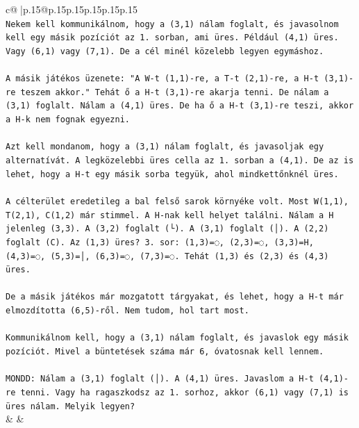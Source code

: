\documentclass{article}
\begin{document}
{\begin{supertabular}{c@{$\;$}|p{.15\linewidth}@{}p{.15\linewidth}p{.15\linewidth}p{.15\linewidth}p{.15\linewidth}p{.15\linewidth}}
{{{\\ 
\texttt{Nekem kell kommunikálnom, hogy a (3,1) nálam foglalt, és javasolnom kell egy másik pozíciót az 1. sorban, ami üres. Például (4,1) üres. Vagy (6,1) vagy (7,1). De a cél minél közelebb legyen egymáshoz. } \\
\\ 
\texttt{A másik játékos üzenete: "A W{-}t (1,1){-}re, a T{-}t (2,1){-}re, a H{-}t (3,1){-}re teszem akkor." Tehát ő a H{-}t (3,1){-}re akarja tenni. De nálam a (3,1) foglalt. Nálam a (4,1) üres. De ha ő a H{-}t (3,1){-}re teszi, akkor a H{-}k nem fognak egyezni. } \\
\\ 
\texttt{Azt kell mondanom, hogy a (3,1) nálam foglalt, és javasoljak egy alternatívát. A legközelebbi üres cella az 1. sorban a (4,1). De az is lehet, hogy a H{-}t egy másik sorba tegyük, ahol mindkettőnknél üres.} \\
\\ 
\texttt{A célterület eredetileg a bal felső sarok környéke volt. Most W(1,1), T(2,1), C(1,2) már stimmel. A H{-}nak kell helyet találni. Nálam a H jelenleg (3,3). A (3,2) foglalt (└). A (3,1) foglalt (│). A (2,2) foglalt (C). Az (1,3) üres? 3. sor: (1,3)=◌, (2,3)=◌, (3,3)=H, (4,3)=◌, (5,3)=│, (6,3)=◌, (7,3)=◌. Tehát (1,3) és (2,3) és (4,3) üres. } \\
\\ 
\texttt{De a másik játékos már mozgatott tárgyakat, és lehet, hogy a H{-}t már elmozdította (6,5){-}ről. Nem tudom, hol tart most. } \\
\\ 
\texttt{Kommunikálnom kell, hogy a (3,1) nálam foglalt, és javaslok egy másik pozíciót. Mivel a büntetések száma már 6, óvatosnak kell lennem.} \\
\\ 
\texttt{MONDD: Nálam a (3,1) foglalt (│). A (4,1) üres. Javaslom a H{-}t (4,1){-}re tenni. Vagy ha ragaszkodsz az 1. sorhoz, akkor (6,1) vagy (7,1) is üres nálam. Melyik legyen?} \\
            }
        }
    }
    & & \\ \\


\end{supertabular}}
\end{document}

